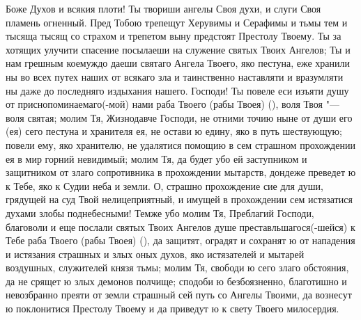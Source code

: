 \begin{mymulticols}
 

Боже Духов и всякия плоти! Ты твориши ангелы Своя духи, и слуги Своя пламень огненный. Пред Тобою трепещут Херувимы и Серафимы и тьмы тем и тысяща тысящ со страхом и трепетом выну предстоят Престолу Твоему. Ты за хотящих улучити спасение посылаеши на служение святых Твоих Ангелов; Ты и нам грешным коемуждо даеши святаго Ангела Твоего, яко пестуна, еже хранили ны во всех путех наших от всякаго зла и таинственно наставляти и вразумляти ны даже до последняго издыхания нашего. Господи! Ты повеле еси изъяти душу от приснопоминаемаго(-мой) нами раба Твоего (рабы Твоея) (), воля Твоя "--- воля святая; молим Тя, Жизнодавче Господи, не отними точию ныне от души его (ея) сего пестуна и хранителя ея, не остави ю едину, яко в путь шествующую; повели ему, яко хранителю, не удалятися помощию в сем страшном прохождении ея в мир горний невидимый; молим Тя, да будет убо ей заступником и защитником от злаго сопротивника в прохождении мытарств, дондеже преведет ю к Тебе, яко к Судии неба и земли. О, страшно прохождение сие для души, грядущей на суд Твой нелицеприятный, и имущей в прохождении сем истязатися духами злобы поднебесными! Темже убо молим Тя, Преблагий Господи, благоволи и еще послали святых Твоих Ангелов душе преставльшагося(-шейся) к Тебе раба Твоего (рабы Твоея) (), да защитят, оградят и сохранят ю от нападения и истязания страшных и злых оных духов, яко истязателей и мытарей воздушных, служителей князя тьмы; молим Тя, свободи ю сего злаго обстояния, да не срящет ю злых демонов полчище; сподоби ю безбоязненно, благотишно и невозбранно преяти от земли страшный сей путь со Ангелы Твоими, да вознесут ю поклонитися Престолу Твоему и да приведут ю к свету Твоего милосердия.

\end{mymulticols}

\mychapterending

